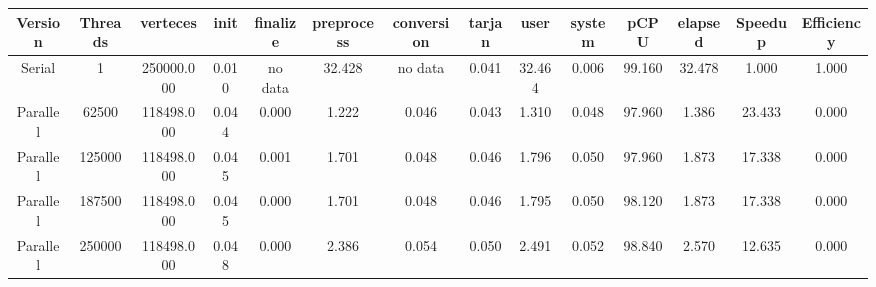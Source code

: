 \begin{tabular}{|c|c|c|c|c|c|c|c|c|c|c|c|c|c|}
\toprule
 Version &  Threads &   verteces &  init & finalize &  preprocess & conversion &  tarjan &   user &  system &   pCPU &  elapsed &  Speedup &  Efficiency \\
\midrule
  Serial &        1 & 250000.000 & 0.010 &  no data &      32.428 &    no data &   0.041 & 32.464 &   0.006 & 99.160 &   32.478 &    1.000 &       1.000 \\
Parallel &    62500 & 118498.000 & 0.044 &    0.000 &       1.222 &      0.046 &   0.043 &  1.310 &   0.048 & 97.960 &    1.386 &   23.433 &       0.000 \\
Parallel &   125000 & 118498.000 & 0.045 &    0.001 &       1.701 &      0.048 &   0.046 &  1.796 &   0.050 & 97.960 &    1.873 &   17.338 &       0.000 \\
Parallel &   187500 & 118498.000 & 0.045 &    0.000 &       1.701 &      0.048 &   0.046 &  1.795 &   0.050 & 98.120 &    1.873 &   17.338 &       0.000 \\
Parallel &   250000 & 118498.000 & 0.048 &    0.000 &       2.386 &      0.054 &   0.050 &  2.491 &   0.052 & 98.840 &    2.570 &   12.635 &       0.000 \\
\bottomrule
\end{tabular}
